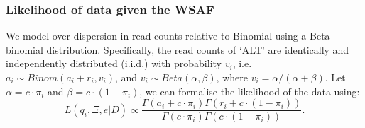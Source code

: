\documentclass{bioinfo}
\begin{document}
\subsubsection{Likelihood of data given the WSAF}
We model over-dispersion in read counts relative to Binomial using a Beta-binomial distribution. Specifically, the read counts of `ALT' are identically and independently distributed (i.i.d.) with probability $v_i$, i.e. $a_i \sim Binom(a_i + r_i, v_i)$, and $v_i \sim Beta(\alpha, \beta)$, where $v_i = \alpha/(\alpha+\beta)$. Let $\alpha = c\cdot \pi_{i} $ and $\beta = c\cdot (1-\pi_{i})$, we can formalise the likelihood of the data using: %
\begin{equation}
L(q_{i}, \Xi, e | D) \propto \frac{\Gamma(a_i + c\cdot \pi_{i}) \Gamma(r_i + c\cdot (1-\pi_{i}))}{\Gamma(c\cdot \pi_{i})\Gamma(c\cdot (1-\pi_{i}))}. \label{eqn:llk}
\end{equation}
\end{document}
